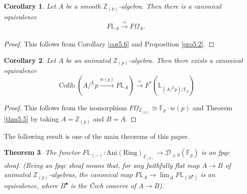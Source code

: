 \documentclass[11pt, a4paper]{amsart}
\theoremstyle{plain}
\newtheorem{theorem}{Theorem}[section]
\newtheorem{coro}[theorem]{Corollary}
\theoremstyle{definition}
\begin{document}
\begin{coro}\label{cor5.9}
    Let $A$ be a smooth $\mathbb Z_{(p)}$-algebra. Then there is a canonical equivalence \[F\mathbb L_A\xrightarrow[]{\simeq}F\Omega_A.\]
\end{coro}
\begin{proof}
    This follows from Corollary \ref{cor5.6} and Proposition \ref{pro5.2}.
\end{proof}
\begin{coro}\label{cor5.10}
    Let $A$ be an animated $\mathbb Z_{(p)}$-algebra. Then there exists a canonical equivalence\[\operatorname{Cofib}(A/^Lp\xrightarrow[]{w(p)}F\mathbb L_A)\xrightarrow[]{\simeq }F^*(\mathbb L_{(A/^Lp)/\mathbb F_p})\]
\end{coro}
\begin{proof}
    This follows from the isomorphism $F\Omega_{\mathbb Z_{(p)}}\cong \mathbb F_p\cdot w(p)$ and Theorem \ref{thm5.5} by taking $A=\mathbb Z_{(p)}$ and $B=A$.
\end{proof}
The following result is one of the main theorems of this paper.
\begin{theorem}\label{thm5.11}
    The functor $F\mathbb L_{(-)}:\operatorname{Ani(Ring)}_{\mathbb Z_{(p)}}\to \mathcal D_{\ge0}(\mathbb F_p)$ is an fpqc sheaf. (Being an fpqc sheaf means that, for any faithfully flat map $A\to B$ of animated $\mathbb Z_{(p)}$-algebras, the canonical map $F\mathbb L_{A}\to \operatorname{lim}_{\Delta}F\mathbb L_{(B^{\bullet})}$ is an equivalence, where $B^{\bullet}$ is the Čech conerve of $A\to B$).
\end{theorem}
\end{document}
